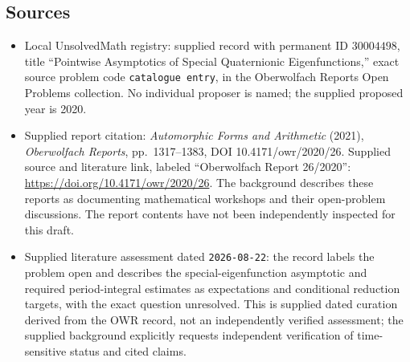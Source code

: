 \documentclass[11pt]{article}
\begin{document}
\subsection{Sources}
\begin{itemize}
\item Local UnsolvedMath registry: supplied record with permanent ID \(30004498\), title ``Pointwise Asymptotics of Special Quaternionic Eigenfunctions,'' exact source problem code \texttt{catalogue entry}, in the Oberwolfach Reports Open Problems collection. No individual proposer is named; the supplied proposed year is 2020.
\item Supplied report citation: \emph{Automorphic Forms and Arithmetic} (2021), \emph{Oberwolfach Reports}, pp.\ 1317--1383, DOI 10.4171/owr/2020/26. Supplied source and literature link, labeled ``Oberwolfach Report 26/2020'': \url{https://doi.org/10.4171/owr/2020/26}. The background describes these reports as documenting mathematical workshops and their open-problem discussions. The report contents have not been independently inspected for this draft.
\item Supplied literature assessment dated \texttt{2026-08-22}: the record labels the problem open and describes the special-eigenfunction asymptotic and required period-integral estimates as expectations and conditional reduction targets, with the exact question unresolved. This is supplied dated curation derived from the OWR record, not an independently verified assessment; the supplied background explicitly requests independent verification of time-sensitive status and cited claims.
\end{itemize}
\end{document}
